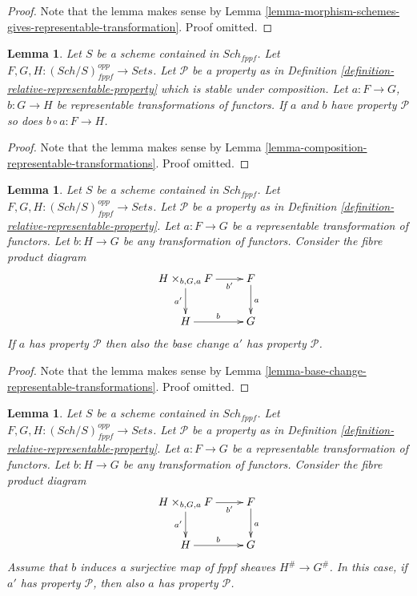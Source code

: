 \documentclass{stacks-project}
\theoremstyle{plain}
\newtheorem{lemma}[subsection]{Lemma}
\theoremstyle{definition}
\theoremstyle{remark}
\numberwithin{equation}{subsection}
\def\Sch{\mathit{Sch}}
\begin{document}
\begin{proof}
Note that the lemma makes sense by
Lemma \ref{lemma-morphism-schemes-gives-representable-transformation}.
Proof omitted.
\end{proof}

\begin{lemma}
\label{lemma-composition-representable-transformations-property}
Let $S$ be a scheme contained in $\Sch_{fppf}$.
Let $F, G, H : (\Sch/S)_{fppf}^{opp} \to \textit{Sets}$.
Let $\mathcal{P}$ be a property as in
Definition \ref{definition-relative-representable-property}
which is stable under composition.
Let $a : F \to G$, $b : G \to H$ be representable transformations of functors.
If $a$ and $b$ have property $\mathcal{P}$ so does
$b \circ a : F \longrightarrow H$.
\end{lemma}

\begin{proof}
Note that the lemma makes sense by
Lemma \ref{lemma-composition-representable-transformations}.
Proof omitted.
\end{proof}

\begin{lemma}
\label{lemma-base-change-representable-transformations-property}
Let $S$ be a scheme contained in $\Sch_{fppf}$.
Let $F, G, H : (\Sch/S)_{fppf}^{opp} \to \textit{Sets}$.
Let $\mathcal{P}$ be a property as in
Definition \ref{definition-relative-representable-property}.
Let $a : F \to G$ be a representable transformation of functors.
Let $b : H \to G$ be any transformation of functors.
Consider the fibre product diagram
$$
\xymatrix{
H \times_{b, G, a} F \ar[r]_-{b'} \ar[d]_{a'} & F \ar[d]^a \\
H \ar[r]^b & G
}
$$
If $a$ has property $\mathcal{P}$ then also the base change $a'$
has property $\mathcal{P}$.
\end{lemma}

\begin{proof}
Note that the lemma makes sense by
Lemma \ref{lemma-base-change-representable-transformations}.
Proof omitted.
\end{proof}

\begin{lemma}
\label{lemma-descent-representable-transformations-property}
Let $S$ be a scheme contained in $\Sch_{fppf}$.
Let $F, G, H : (\Sch/S)_{fppf}^{opp} \to \textit{Sets}$.
Let $\mathcal{P}$ be a property as in
Definition \ref{definition-relative-representable-property}.
Let $a : F \to G$ be a representable transformation of functors.
Let $b : H \to G$ be any transformation of functors.
Consider the fibre product diagram
$$
\xymatrix{
H \times_{b, G, a} F \ar[r]_-{b'} \ar[d]_{a'} & F \ar[d]^a \\
H \ar[r]^b & G
}
$$
Assume that $b$ induces a surjective map of fppf sheaves $H^\# \to G^\#$.
In this case, if $a'$ has property $\mathcal{P}$, then also $a$
has property $\mathcal{P}$.
\end{lemma}
\end{document}
